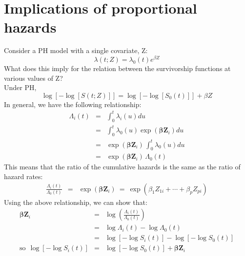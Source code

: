 \documentclass[11pt,psfig]{book}
\begin{document}
\section{Implications of proportional hazards}
Consider a PH model with a single covariate, Z:
\[   \lambda(t; Z)  = \lambda_0(t) e^{\beta Z} \]
What does this imply for the relation between the survivorship
functions at various values of Z?
\\[2ex]
Under PH,
\[  \log[-\log[S(t;Z)]] =  \log[-\log[S_0(t)]] + \beta Z \]
In general, we have the following relationship:
\begin{eqnarray*}
\Lambda_i(t) & = & \int_0^t \lambda_i(u) du\\[1ex]
             & = & \int_0^t \lambda_0(u) \exp(\mathbf{\beta}\mathbf{Z}_i) du\\[1ex]
             & = & \exp(\mathbf{\beta}\mathbf{Z}_i) \, \int_0^t \lambda_0(u) du\\[1ex]
             & = & \exp(\mathbf{\beta}\mathbf{Z}_i) \, \Lambda_0(t)
\end{eqnarray*}
This means that the ratio of the cumulative hazards is the same
as the ratio of hazard rates:
\begin{eqnarray*}
\frac{\Lambda_i(t)}{\Lambda_0(t)} & = & \exp(\mathbf{\beta}\mathbf{Z}_i)
~=~ \exp(\beta_1 Z_{1i} + \cdots + \beta_p Z_{pi})
\end{eqnarray*}
Using the above relationship, we can show that:
\begin{eqnarray*}
\mathbf{\beta}\mathbf{Z}_i & = & \log \left(\frac{\Lambda_i(t)}{\Lambda_0(t)}\right)\\[2ex]
& = & \log \Lambda_i(t) - \log \Lambda_0(t)  \\[2ex]
& = & \log[-\log S_i(t)] - \log[-\log S_0(t)]  \\[2ex]
\mbox{so}~~ \log[-\log S_i(t)] & = & \log[-\log S_0(t)] + \mathbf{\beta}\mathbf{Z}_i
\end{eqnarray*}
\end{document}
